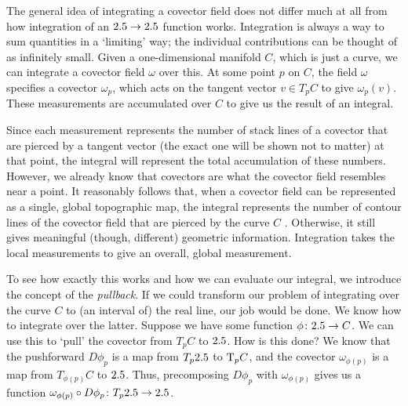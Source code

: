 \documentclass[a4paper,12pt]{article}
\begin{document}
The general idea of integrating a covector field does not differ much at all from how integration of an $2.5 \to 2.5$ function works.
Integration is always a way to sum quantities in a `limiting' way; the individual contributions can be thought of as infinitely small.
Given a one-dimensional manifold $C$, which is just a curve, we can integrate a covector field $\omega$ over this.
At some point $p$ on $C$, the field $\omega$ specifies a covector $\omega_p$, which acts on the tangent vector $v \in T_p C$ to give $\omega_p(v)$.
These measurements are accumulated over $C$ to give us the result of an integral.

Since each measurement represents the number of stack lines of a covector that are pierced by a tangent vector (the exact one will be shown not to matter) at that point, the integral will represent the total accumulation of these numbers.
However, we already know that covectors are what the covector field resembles near a point.
It reasonably follows that, when a covector field can be represented as a single, global topographic map, the integral represents the number of contour lines of the covector field that are pierced by the curve $C$ \cite{covector_integration_visualization}.
Otherwise, it still gives meaningful (though, different) geometric information.
Integration takes the local measurements to give an overall, global measurement.

To see how exactly this works and how we can evaluate our integral, we introduce the concept of the \emph{pullback}.
If we could transform our problem of integrating over the curve $C$ to (an interval of) the real line, our job would be done.
We know how to integrate over the latter.
Suppose we have some function $\phi\colon 2.5 \to C$.
We can use this to `pull' the covector from $T_p C$ to $2.5$.
How is this done?
We know that the pushforward $D\phi_p$ is a map from $T_p 2.5$ to $\mathrm{T}_p C$, and the covector $\omega_{\phi(p)}$ is a map from $T_{\phi(p)} C$ to $2.5$.
Thus, precomposing $D\phi_p$ with $\omega_{\phi(p)}$ gives us a function $\omega_{\phi(p)} \circ D\phi_p \colon T_p 2.5 \to 2.5$.
\end{document}
